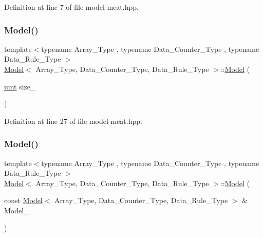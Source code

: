 Definition at line 7 of file model-\/meat.\+hpp.

\mbox{\label{class_model_a46639bb435ca2992dac8858528a5362e}} 
\subsubsection{\texorpdfstring{Model()}{Model()}\hspace{0.1cm}{\footnotesize\ttfamily [2/3]}}
{\footnotesize\ttfamily template$<$typename Array\+\_\+\+Type , typename Data\+\_\+\+Counter\+\_\+\+Type , typename Data\+\_\+\+Rule\+\_\+\+Type $>$ \\
\hyperlink{class_model}{Model}$<$ Array\+\_\+\+Type, Data\+\_\+\+Counter\+\_\+\+Type, Data\+\_\+\+Rule\+\_\+\+Type $>$\+::\hyperlink{class_model}{Model} (\begin{DoxyParamCaption}\item[{\hyperlink{typedefs_8hpp_a91ad9478d81a7aaf2593e8d9c3d06a14}{uint}}]{size\+\_\+ }\end{DoxyParamCaption})\hspace{0.3cm}{\ttfamily [inline]}}



Definition at line 27 of file model-\/meat.\+hpp.

\mbox{\label{class_model_a047905a921baa9e51a4f07d337379375}} 
\subsubsection{\texorpdfstring{Model()}{Model()}\hspace{0.1cm}{\footnotesize\ttfamily [3/3]}}
{\footnotesize\ttfamily template$<$typename Array\+\_\+\+Type , typename Data\+\_\+\+Counter\+\_\+\+Type , typename Data\+\_\+\+Rule\+\_\+\+Type $>$ \\
\hyperlink{class_model}{Model}$<$ Array\+\_\+\+Type, Data\+\_\+\+Counter\+\_\+\+Type, Data\+\_\+\+Rule\+\_\+\+Type $>$\+::\hyperlink{class_model}{Model} (\begin{DoxyParamCaption}\item[{const \hyperlink{class_model}{Model}$<$ Array\+\_\+\+Type, Data\+\_\+\+Counter\+\_\+\+Type, Data\+\_\+\+Rule\+\_\+\+Type $>$ \&}]{Model\+\_\+ }\end{DoxyParamCaption})\hspace{0.3cm}{\ttfamily [inline]}}



